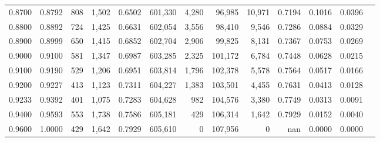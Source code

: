 \begin{tabular}{rrrrrrrrrrrrr}
0.8700 & 0.8792 &    808 & 1,502 &                                     0.6502 & 601,330 &   4,280 &  96,985 &  10,971 & 0.7194 & 0.1016 & 0.0396 \\
0.8800 & 0.8892 &    724 & 1,425 &                                     0.6631 & 602,054 &   3,556 &  98,410 &   9,546 & 0.7286 & 0.0884 & 0.0329 \\
0.8900 & 0.8999 &    650 & 1,415 &                                     0.6852 & 602,704 &   2,906 &  99,825 &   8,131 & 0.7367 & 0.0753 & 0.0269 \\
0.9000 & 0.9100 &    581 & 1,347 &                                     0.6987 & 603,285 &   2,325 & 101,172 &   6,784 & 0.7448 & 0.0628 & 0.0215 \\
0.9100 & 0.9190 &    529 & 1,206 &                                     0.6951 & 603,814 &   1,796 & 102,378 &   5,578 & 0.7564 & 0.0517 & 0.0166 \\
0.9200 & 0.9227 &    413 & 1,123 &                                     0.7311 & 604,227 &   1,383 & 103,501 &   4,455 & 0.7631 & 0.0413 & 0.0128 \\
0.9233 & 0.9392 &    401 & 1,075 &                                     0.7283 & 604,628 &     982 & 104,576 &   3,380 & 0.7749 & 0.0313 & 0.0091 \\
0.9400 & 0.9593 &    553 & 1,738 &                                     0.7586 & 605,181 &     429 & 106,314 &   1,642 & 0.7929 & 0.0152 & 0.0040 \\
0.9600 & 1.0000 &    429 & 1,642 &                                     0.7929 & 605,610 &       0 & 107,956 &       0 &    nan & 0.0000 & 0.0000 \\
\bottomrule
\end{tabular}
